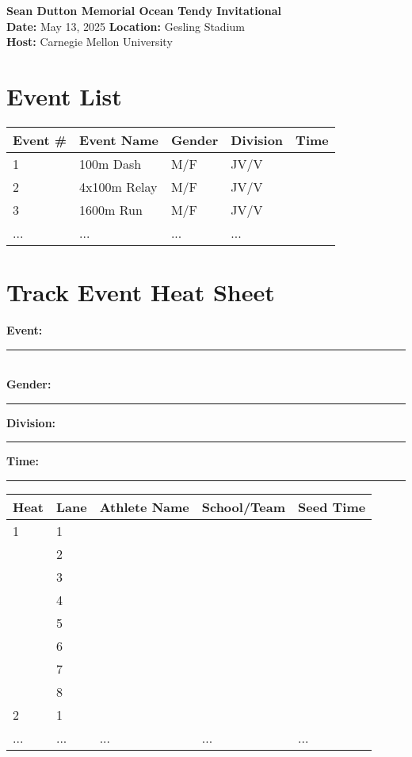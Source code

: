 \documentclass[11pt]{article}
\begin{document}
\begin{center}
    \LARGE \textbf{Sean Dutton Memorial Ocean Tendy Invitational} \\
    \large
    \vspace{0.5em}
    \textbf{Date:} May 13, 2025 \hspace{2cm} \textbf{Location:} Gesling Stadium \\
    \textbf{Host:} Carnegie Mellon University
\end{center}

\vspace{1em}

\section*{Event List}

\begin{tabular}{@{}lllll@{}}
\toprule
\textbf{Event \#} & \textbf{Event Name} & \textbf{Gender} & \textbf{Division} & \textbf{Time} \\
\midrule
1 & 100m Dash       & M/F & JV/V & \\
2 & 4x100m Relay    & M/F & JV/V & \\
3 & 1600m Run       & M/F & JV/V & \\
... & ...           & ... & ...  & \\
\bottomrule
\end{tabular}



\vspace{2em}

\section*{Track Event Heat Sheet}

\textbf{Event:} \rule{10cm}{0.4pt} \\
\textbf{Gender:} \rule{3cm}{0.4pt} \hspace{1cm} \textbf{Division:} \rule{3cm}{0.4pt} \hspace{1cm} \textbf{Time:} \rule{3cm}{0.4pt}

\vspace{1em}

\begin{tabular}{@{}lllll@{}}
\toprule
\textbf{Heat} & \textbf{Lane} & \textbf{Athlete Name} & \textbf{School/Team} & \textbf{Seed Time} \\
\midrule
1 & 1 & & & \\
  & 2 & & & \\
  & 3 & & & \\
  & 4 & & & \\
  & 5 & & & \\
  & 6 & & & \\
  & 7 & & & \\
  & 8 & & & \\
2 & 1 & & & \\
... & ... & ... & ... & ... \\
\bottomrule
\end{tabular}
\end{document}
